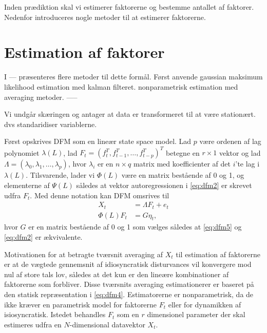 Inden prædiktion skal vi estimerer faktorerne og bestemme antallet af faktorer.
Nedenfor introduceres nogle metoder til at estimerer faktorerne.

\section{Estimation af faktorer}
I --- præsenteres flere metoder til dette formål.
Først anvende gaussian maksimum likelihood estimation med kalman filteret.
nonparametrisk estimation med averaging metoder.
-----

Vi undgår skæringen og antager at data er transformeret til at være stationært.
dvs standaridiser variablerne.



Først opskrives DFM som en lineær state space model.
Lad $p$ være ordenen af lag polynomiet $\lambda(L)$, lad $F_t=(f_t^T,f_{t-1}^T,\ldots,f_{t-p}^T)^T$ betegne en $r \times 1$ vektor og lad $\Lambda=(\lambda_0,\lambda_1,\ldots,\lambda_p)$, hvor $\lambda_i$ er en $n \times q$ matrix med koefficienter af det $i$'te lag i $\lambda(L)$.
Tilsvarende, lader vi $\Phi(L)$ være en matrix bestående af 0 og 1, og elementerne af $\Psi(L)$ således at vektor autoregressionen i \eqref{eq:dfm2} er skrevet udfra $F_t$.
Med denne notation kan DFM omsrives til
\begin{align}
X_t &= \Lambda F_t + e_t \label{eq:dfm4}\\
\Phi(L) F_t &= G \eta_t, \label{eq:dfm5}
\end{align}
hvor $G$ er en matrix bestående af 0 og 1 som vælges således at \eqref{eq:dfm5} og \eqref{eq:dfm2} er ækvivalente.

Motivationen for at betragte tværsnit averaging af \(X_t\) til estimation af faktorerne er at de vægtede gennemsnit af idiosyncratisk disturvances vil konvergere mod nul af store tals lov, således at det kun er den lineære kombinationer af faktorerne som forbliver.
Disse tværsnits averaging estimationerer er baseret på den statisk repræsentation i \eqref{eq:dfm4}.
Estimatorerne er nonparametrisk, da de ikke kræver en parametrisk model for faktorerne \(F_t\) eller for dynamikken af isiosyncratisk.
Istedet behandles \(F_t\) som en \(r\) dimensionel parameter der skal estimeres udfra en \(N\)-dimensional datavektor \(X_t\).

